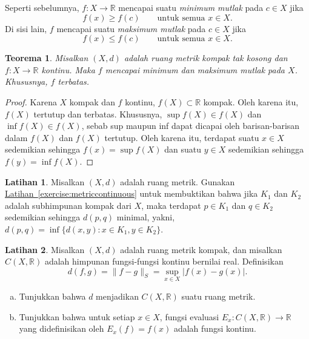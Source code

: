 \documentclass[12pt,openany]{book}
\newcommand{\snorm}[1]{\lVert {#1} \rVert}
\newcommand{\abs}[1]{\left\lvert {#1} \right\rvert}
\newcommand{\R}{{\mathbb{R}}}
\newcommand{\myindex}[1]{#1\index{#1}}
\theoremstyle{plain}
\newtheorem{thm}{Teorema}[section]
\theoremstyle{remark}
\theoremstyle{definition}
\newenvironment{exbox}{%
    \def\FrameCommand{\vrule width 1pt \relax\hspace{10pt}}%
    \MakeFramed{\advance\hsize-\width\FrameRestore}%
}{%
    \endMakeFramed
}
\newenvironment{exparts}{%
    \leavevmode\begin{enumerate}[a),noitemsep,topsep=0pt,parsep=0pt,partopsep=0pt]
}{%
    \end{enumerate}
}
\theoremstyle{exercise}
\newtheorem{exercise}{Latihan}[section]
\theoremstyle{example}
\newcommand{\exerciseref}[1]{\hyperref[#1]{Latihan~\ref*{#1}}}
\begin{document}
Seperti sebelumnya, $f \colon X \to \R$ mencapai suatu
\emph{\myindex{minimum mutlak}} pada $c \in X$ jika
\begin{equation*}
f(x) \geq f(c) \qquad \text{untuk semua } x \in X.
\end{equation*}
Di sisi lain, $f$ mencapai suatu 
\emph{\myindex{maksimum mutlak}} pada $c \in X$ jika
\begin{equation*}
f(x) \leq f(c) \qquad \text{untuk semua } x \in X.
\end{equation*}

\begin{thm}
Misalkan $(X,d)$ adalah ruang metrik kompak tak kosong
dan $f \colon X \to \R$ kontinu.  Maka
$f$ mencapai minimum dan maksimum mutlak pada $X$.
Khususnya, $f$ terbatas.
\end{thm}

\begin{proof}
Karena $X$ kompak dan $f$ kontinu,
$f(X) \subset \R$ kompak.  Oleh karena itu, $f(X)$ tertutup
dan terbatas.  Khususnya,
$\sup f(X) \in f(X)$ dan
$\inf f(X) \in f(X)$, sebab sup maupun inf
dapat dicapai oleh barisan-barisan dalam $f(X)$ dan $f(X)$ tertutup.
Oleh karena itu, terdapat suatu $x \in X$ sedemikian sehingga $f(x) = \sup f(X)$
dan suatu $y \in X$ sedemikian sehingga $f(y) = \inf f(X)$.
\end{proof}

\begin{exbox}
\begin{exercise}
Misalkan $(X,d)$ adalah ruang metrik.
Gunakan \exerciseref{exercise:metriccontinuous} untuk membuktikan bahwa
jika $K_1$ dan $K_2$ adalah subhimpunan kompak dari $X$, maka
terdapat $p \in K_1$ dan $q \in K_2$ sedemikian sehingga $d(p,q)$ minimal,
yakni, $d(p,q) = \inf \{ d(x,y) \colon x \in K_1, y \in K_2 \}$.
\end{exercise}

\begin{exercise}
Misalkan $(X,d)$ adalah ruang metrik kompak, dan misalkan $C(X,\R)$ adalah himpunan
fungsi-fungsi kontinu bernilai real.  Definisikan
\begin{equation*}
d(f,g) = \snorm{f-g}_S = \sup_{x \in X} \abs{f(x)-g(x)} .
\end{equation*}
\begin{exparts}
\item
Tunjukkan bahwa $d$ menjadikan $C(X,\R)$ suatu ruang metrik.
\item
Tunjukkan bahwa untuk setiap $x \in X$, fungsi evaluasi
$E_x \colon C(X,\R) \to \R$ yang didefinisikan oleh $E_x(f) = f(x)$
adalah fungsi kontinu.
\end{exparts}
\end{exercise}
\end{exbox}
\end{document}
